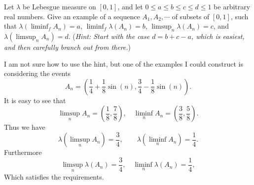 \begin{problem}
	Let $ \lambda $ be Lebesgue measure on $ [0,1] $, and let $ 0 \leq a \leq b \leq c\leq d \leq 1 $ be arbitrary real numbers. Give an example of a sequence $ A_1,A_2,\cdots $ of subsets of $ [0,1] $, such that $ \lambda(\liminf_f A_n) = a $, $ \liminf_f \lambda(A_n) = b $, $ \limsup_n \lambda(A_n) = c $, and $ \lambda(\limsup_n A_n) = d $. (\emph{Hint: Start with the case $ d = b + c - a $, which is easiest, and then carefully branch out from there.})
\end{problem}
\begin{solution}
	I am not sure how to use the hint, but one of the examples I could construct is considering the events
	\[ A_n = (\frac{1}{4}+\frac{1}{8}\sin(n), \frac{3}{4}-\frac{1}{8}\sin(n)). \]
	It is easy to see that
	\[ \limsup_n A_n = (\frac{1}{8},\frac{7}{8}),\quad  \liminf_n A_n = (\frac{3}{8},\frac{5}{8}). \]
	Thus we have
	\[ \lambda(\limsup_n A_n) = \frac{3}{4},\qquad \lambda(\liminf_n A_n) = \frac{1}{4}. \]
	Furthermore
	\[ \limsup_n\lambda(A_n) = \frac{3}{4},\quad \liminf_n\lambda(A_n) = \frac{1}{4}, \]
	Which satisfies the requirements.
\end{solution}

